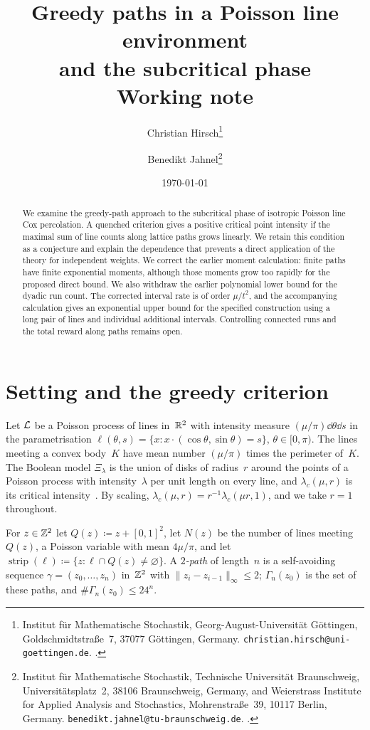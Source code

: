 \documentclass[11pt,letterpaper]{article}
\title{\textbf{Greedy paths in a Poisson line environment\\ and the subcritical phase}\\[0.6em] \large Working note}
\author{%
  Christian Hirsch\thanks{Institut f\"ur Mathematische Stochastik, Georg-August-Universit\"at G\"ottingen, Goldschmidtstra\ss e~7, 37077 G\"ottingen, Germany. \texttt{christian.hirsch@uni-goettingen.de}. \orcid{0000-0003-4136-3740}.}
  \and
  Benedikt Jahnel\thanks{Institut f\"ur Mathematische Stochastik, Technische Universit\"at Braunschweig, Universit\"atsplatz~2, 38106 Braunschweig, Germany, and Weierstrass Institute for Applied Analysis and Stochastics, Mohrenstra\ss e~39, 10117 Berlin, Germany. \texttt{benedikt.jahnel@tu-braunschweig.de}. \orcid{0000-0002-4212-0065}.}%
}
\date{\today}
\begin{document}
\maketitle
\thispagestyle{plain}

\begin{abstract}
We examine the greedy-path approach to the subcritical phase of isotropic Poisson line Cox percolation. A quenched criterion gives a positive critical point intensity if the maximal sum of line counts along lattice paths grows linearly. We retain this condition as a conjecture and explain the dependence that prevents a direct application of the theory for independent weights. We correct the earlier moment calculation: finite paths have finite exponential moments, although those moments grow too rapidly for the proposed direct bound. We also withdraw the earlier polynomial lower bound for the dyadic run count. The corrected interval rate is of order $\mu/t^2$, and the accompanying calculation gives an exponential upper bound for the specified construction using a long pair of lines and individual additional intervals. Controlling connected runs and the total reward along paths remains open.
\end{abstract}

\section{Setting and the greedy criterion}
\label{sec:setting}

Let $\mathcal L$ be a Poisson process of lines in~$\mathbb R^2$ with intensity measure $(\mu/\pi)\dd\theta\dd s$ in the parametrisation $\ell(\theta,s)=\{x\colon x\cdot(\cos\theta,\sin\theta)=s\}$, $\theta\in[0,\pi)$. The lines meeting a convex body~$K$ have mean number $(\mu/\pi)$ times the perimeter of~$K$. The Boolean model $\Xi_\lambda$ is the union of disks of radius~$r$ around the points of a Poisson process with intensity~$\lambda$ per unit length on every line, and $\lambda_c(\mu,r)$ is its critical intensity~\cite{HJ26}. By scaling, $\lambda_c(\mu,r)=r^{-1}\lambda_c(\mu r,1)$, and we take $r=1$ throughout.

For $z\in\mathbb Z^2$ let $Q(z)\coloneqq z+[0,1]^2$, let $N(z)$ be the number of lines meeting~$Q(z)$, a Poisson variable with mean $4\mu/\pi$, and let $\operatorname{strip}(\ell)\coloneqq\{z\colon\ell\cap Q(z)\neq\varnothing\}$. A \emph{$2$-path} of length~$n$ is a self-avoiding sequence $\gamma=(z_0,\dots,z_n)$ in~$\mathbb Z^2$ with $\lVert z_i-z_{i-1}\rVert_\infty\le2$; $\Gamma_n(z_0)$ is the set of these paths, and $\#\Gamma_n(z_0)\le24^n$.
\end{document}
